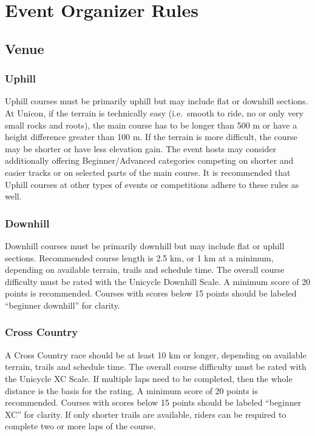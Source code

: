 \chapter{Event Organizer Rules}

\section{Venue}

\subsection{Uphill}
Uphill courses must be primarily uphill but may include flat or downhill sections.
At Unicon, if the terrain is technically easy (i.e.\ smooth to ride, no or only very small rocks and roots), the main course has to be longer than 500 m or have a height difference greater than 100 m.
If the terrain is more difficult, the course may be shorter or have less elevation gain.
The event hosts may consider additionally offering Beginner/Advanced categories competing on shorter and easier tracks or on selected parts of the main course.
It is recommended that Uphill courses at other types of events or competitions adhere to these rules as well.

\subsection{Downhill}
Downhill courses must be primarily downhill but may include flat or uphill sections.
Recommended course length is 2.5 km, or 1 km at a minimum, depending on available terrain, trails and schedule time.
The overall course difficulty must be rated with the Unicycle Downhill Scale.
A minimum score of 20 points is recommended.
Courses with scores below 15 points should be labeled ``beginner downhill'' for clarity.

\subsection{Cross Country}
A Cross Country race should be at least 10 km or longer, depending on available terrain, trails and schedule time.
The overall course difficulty must be rated with the Unicycle XC Scale.
If multiple laps need to be completed, then the whole distance is the basis for the rating.
A minimum score of 20 points is recommended.
Courses with scores below 15 points should be labeled ``beginner XC'' for clarity.
If only shorter trails are available, riders can be required to complete two or more laps of the course.

